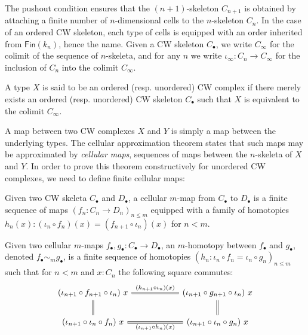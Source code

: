 \documentclass{easychair}
\begin{document}
The pushout condition ensures that the \( (n + 1) \)-skeleton \( C_{n+1} \) is obtained by attaching
a finite number of \( n \)-dimensional cells to the \( n \)-skeleton \( C_n \). In the case of an
ordered CW skeleton, each type of cells is equipped with an order inherited from \( \mathsf{Fin}(k_n) \),
hence the name.
%
Given a CW skeleton \( C_{\bullet} \), we write \( C_\infty \) for the colimit of the sequence of
\( n \)-skeleta, and for any \( n \) we write $\iota_\infty : C_n \to C_\infty$ for the inclusion of
$C_n$ into the colimit $C_\infty$.

\begin{definition}[CW complexes]
  A type \( X \) is said to be an ordered (resp. unordered) CW complex if there merely exists an
  ordered (resp. unordered) CW skeleton \( C_{\bullet} \) such that \( X \) is equivalent to the
  colimit \( C_\infty \).
\end{definition}

A map between two CW complexes \( X \) and \( Y \) is simply a map between the underlying types.
%
The cellular approximation theorem states that such maps may be approximated by \emph{cellular maps},
\ie sequences of maps between the \( n \)-skeleta of \( X \) and \( Y \).
%
In order to prove this theorem constructively for unordered CW complexes, we need to define finite
cellular maps:

\begin{definition}
  Given two CW skeleta $C_\bullet$ and $D_\bullet$, a cellular $m$-map from \( C_\bullet \) to \( D_\bullet \)
  is a finite sequence of maps $(f_n : C_n \to D_n)_{n \leq m}$ equipped with a family of homotopies
  $h_n(x) : (\iota_n \circ f_{n})(x) = (f_{n+1} \circ \iota_n)(x)$ for $n < m$.
\end{definition}

\begin{definition}
  Given two cellular $m$-maps $f_\bullet , g_\bullet : C_\bullet \to D_\bullet$, an
  $m$-homotopy between \( f_\bullet \) and \( g_\bullet \), denoted $f_\bullet \sim_m g_\bullet$, is a finite sequence of homotopies\linebreak
  \( (h_n : \iota_n \circ f_n = \iota_n \circ g_n)_{n \leq m} \) such that for \( n < m \) and \( x : C_n \) the following square commutes:
  \[
\begin{tikzcd}[ampersand replacement=\&,column sep = 2cm]
	{(\iota_{n+1} \circ f_{n+1} \circ \iota_n)~x} \& {(\iota_{n+1} \circ g_{n+1} \circ \iota_n)~x} \\
	{(\iota_{n+1} \circ \iota_n \circ f_n)~x} \& {(\iota_{n+1} \circ \iota_n \circ g_n)~x}
	\arrow[double equal sign distance, -, double, "{(h_{n+1} \circ \iota_n)(x)}", from=1-1, to=1-2]
	\arrow[double equal sign distance, -, double, from=1-1, to=2-1]
	\arrow[double equal sign distance, -, double, "{(\iota_{n+1} \circ h_n)(x)}"', from=2-1, to=2-2]
	\arrow[double equal sign distance, -, double, from=1-2, to=2-2]
\end{tikzcd}
\]
\end{definition}
\end{document}
